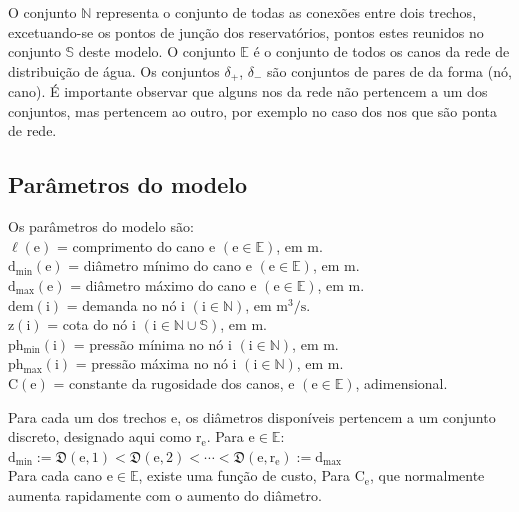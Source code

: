 \documentclass[
	12pt,				%
	openright,			%
	twoside,			%
	a4paper,			%
	english,			%
	french,				%
	spanish,			%
	brazil				%
	]{abntex2}
\newcommand{\setN}{\mathbb{N}}
\newcommand{\setE}{\mathbb{E}}
\newcommand{\setS}{\mathbb{S}}
\newcommand{\edge}{\mathrm{e}}
\newcommand{\inode}{\mathrm{i}}
\newcommand{\dmin}{\mathrm{d_{min}}}
\newcommand{\dmax}{\mathrm{d_{max}}}
\newcommand{\phmin}{\mathrm{ph_{min}}}
\newcommand{\phmax}{\mathrm{ph_{max}}}
\newcommand{\dem}{\mathrm{dem}}
\newcommand{\DT}{\mathfrak{D}}
\newcommand{\z}{\mathrm{z}}
\newcommand{\C}{\mathrm{C}}
\begin{document}
O conjunto $\setN$ representa o conjunto de todas as conexões entre dois trechos, excetuando-se os pontos de junção dos reservatórios, pontos estes reunidos no conjunto $\setS$ deste modelo. O conjunto $\setE$ é o conjunto de todos os canos da rede de distribuição de água. Os conjuntos $\delta_{+}$, $\delta_{-}$ são conjuntos de pares de da forma (nó, cano). É importante observar que alguns nos da rede não pertencem a um dos conjuntos, mas pertencem ao outro, por exemplo no caso dos nos que são ponta de rede.

\subsection{Parâmetros do modelo} 

Os parâmetros do modelo são:\\
\noindent
$\ell \!\left( \edge \right)$ = comprimento do cano $\edge$ $\left( \edge \in \setE \right)$, em m. \\ 
$\dmin \!\left( \edge \right)$ = diâmetro mínimo do cano $\edge$ $\left( \edge \in \setE \right)$, em m. \\
$\dmax \!\left( \edge \right)$ = diâmetro máximo do cano $\edge$ $\left( \edge \in \setE \right)$, em m. \\
$\dem\!\left( \inode \right)$ = demanda no nó $\inode$ $\left( \inode \in \setN \right)$, em $\mathrm{m^{3}/s}$. \\
$\z\!\left( \inode \right)$ = cota do nó $\inode$ $\left( \inode \in \setN \cup \setS \right)$, em m. \\
$\phmin\!\left( \inode \right)$ = pressão mínima no nó $\inode$ $\left( \inode \in \setN \right)$, em m. \\
$\phmax\!\left( \inode \right)$ = pressão máxima no nó $\inode$ $\left( \inode \in \setN \right)$, em m. \\
$\C\!\left( \edge \right)$ = constante da rugosidade dos canos, $\edge$ $\left( \edge \in \setE \right)$, adimensional.

Para cada um dos trechos $\edge$, os diâmetros disponíveis pertencem a um conjunto discreto, designado aqui como $\mathrm{r_{e}}$. Para $ \edge \in \setE $: \\

$\dmin := \DT\left( \edge, 1 \right) < \DT\left( \edge, 2 \right) < \cdots < \DT\left( \edge, \mathrm{r_{e}} \right) := \dmax$  \\

Para cada cano $ \edge \in \setE $, existe uma função de custo, Para $ \mathrm{C_{e}}$, que normalmente aumenta rapidamente com o aumento do diâmetro.
\end{document}
